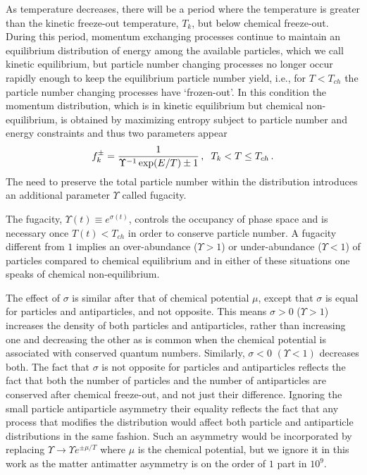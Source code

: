 As temperature decreases, there will be a period where the temperature is greater than the kinetic freeze-out temperature, $T_k$, but below chemical freeze-out. During this period, momentum exchanging processes continue to maintain an equilibrium distribution of energy among the available particles, which we call kinetic equilibrium, but particle number changing processes no longer occur rapidly enough to keep the equilibrium particle number yield, i.e., for $T<T_{ch}$ the particle number changing processes have `frozen-out'. In this condition the momentum distribution, which is in kinetic equilibrium but chemical non-equilibrium, is obtained by maximizing  entropy subject to  particle number and energy constraints and thus two parameters appear
\begin{equation}\label{k_eq}
f_{k}^\pm=\frac{1}{\Upsilon^{-1} \exp(E/T)\pm 1}\,,\hspace{2mm} T_k<T\leq T_{ch}\,.
\end{equation}
The need to preserve the total particle number within the distribution introduces an additional parameter $\Upsilon$ called fugacity. 



The fugacity, $\Upsilon(t)\equiv e^{\sigma(t)}$, controls the occupancy of phase space and is necessary once $T(t)<T_{ch}$ in order to conserve particle number.  A fugacity different from $1$ implies an over-abundance ($\Upsilon>1$) or under-abundance ($\Upsilon<1$) of particles compared to chemical equilibrium and in either of these  situations one speaks of chemical non-equilibrium. 

The effect of $\sigma$ is similar after that of chemical potential $\mu$, except that $\sigma$ is equal for particles and antiparticles, and not opposite. This means $\sigma>0$ ($\Upsilon>1$) increases the density of both particles and antiparticles, rather than increasing one and decreasing the other as is common when the chemical potential is associated with conserved quantum numbers.  Similarly, $\sigma<0$ $(\Upsilon<1)$ decreases both. The fact that $\sigma$ is not opposite for particles and antiparticles reflects the fact that both  the number of particles and the number of antiparticles are conserved after chemical freeze-out, and not just their difference.  Ignoring the small particle antiparticle asymmetry their equality reflects the fact that any process that modifies  the distribution would affect both particle and antiparticle distributions in the same fashion.   Such an asymmetry would be incorporated by replacing $\Upsilon\rightarrow \Upsilon e^{\pm\mu/T}$ where $\mu$ is the chemical potential, but we ignore it in this work as the matter antimatter asymmetry is on the order of $1$ part in $10^9$.

